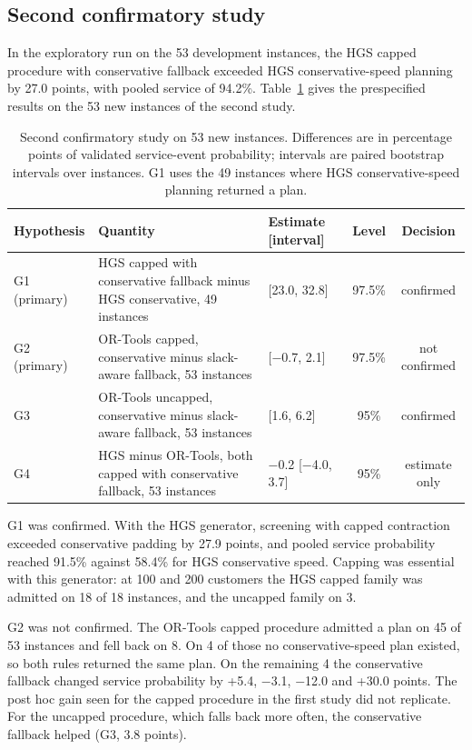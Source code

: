 \subsection{Second confirmatory study}\label{sec:confirmatory2}

In the exploratory run on the 53 development instances, the HGS capped procedure with conservative fallback exceeded HGS conservative-speed planning by 27.0 points, with pooled service of 94.2\%. Table~\ref{tab:confirmatory2} gives the prespecified results on the 53 new instances of the second study.

\begin{table}[htbp]
\centering
\footnotesize
\caption{Second confirmatory study on 53 new instances. Differences are in percentage points of validated service-event probability; intervals are paired bootstrap intervals over instances. G1 uses the 49 instances where HGS conservative-speed planning returned a plan.}
\label{tab:confirmatory2}
\begin{tabular}{@{}>{\raggedright\arraybackslash}p{1.9cm}>{\raggedright\arraybackslash}p{4.4cm}>{\raggedright\arraybackslash}p{3.3cm}cc@{}}
\toprule
Hypothesis & Quantity & Estimate [interval] & Level & Decision\\
\midrule
G1 (primary) & HGS capped with conservative fallback minus HGS conservative, 49 instances & 27.9 [23.0, 32.8] & 97.5\% & confirmed\\
G2 (primary) & OR-Tools capped, conservative minus slack-aware fallback, 53 instances & 0.4 [$-$0.7, 2.1] & 97.5\% & not confirmed\\
G3 & OR-Tools uncapped, conservative minus slack-aware fallback, 53 instances & 3.8 [1.6, 6.2] & 95\% & confirmed\\
G4 & HGS minus OR-Tools, both capped with conservative fallback, 53 instances & $-$0.2 [$-$4.0, 3.7] & 95\% & estimate only\\
\bottomrule
\end{tabular}
\end{table}

G1 was confirmed. With the HGS generator, screening with capped contraction exceeded conservative padding by 27.9 points, and pooled service probability reached 91.5\% against 58.4\% for HGS conservative speed. Capping was essential with this generator: at 100 and 200 customers the HGS capped family was admitted on 18 of 18 instances, and the uncapped family on 3.

G2 was not confirmed. The OR-Tools capped procedure admitted a plan on 45 of 53 instances and fell back on 8. On 4 of those no conservative-speed plan existed, so both rules returned the same plan. On the remaining 4 the conservative fallback changed service probability by +5.4, $-$3.1, $-$12.0 and +30.0 points. The post hoc gain seen for the capped procedure in the first study did not replicate. For the uncapped procedure, which falls back more often, the conservative fallback helped (G3, 3.8 points).


